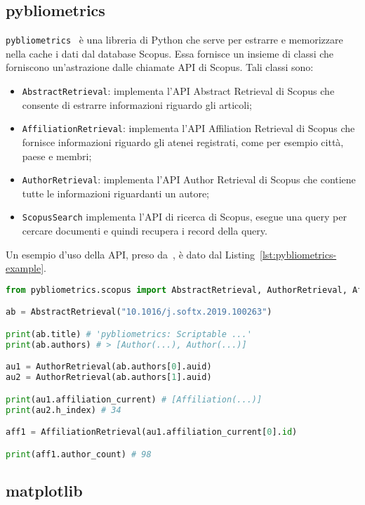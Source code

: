 \subsection{pybliometrics}\label{sec:pybliometrics}

\texttt{pybliometrics}~\cite{pybliometrics} è una libreria di Python che serve per estrarre e memorizzare nella cache i dati dal database Scopus.
Essa fornisce un insieme di classi che forniscono un'astrazione dalle chiamate
API di Scopus. Tali classi sono:
\begin{itemize}
	\item \texttt{AbstractRetrieval}: implementa l'API Abstract Retrieval di
	Scopus che consente di estrarre informazioni riguardo gli articoli;
	\item \texttt{AffiliationRetrieval}: implementa l'API Affiliation Retrieval
	di Scopus che fornisce informazioni riguardo gli atenei registrati, come per
	esempio città, paese e membri;
	\item \texttt{AuthorRetrieval}: implementa l'API Author Retrieval di Scopus
	che contiene tutte le informazioni riguardanti un autore;
	\item \texttt{ScopusSearch} implementa l'API di ricerca di Scopus, esegue una
	query per cercare documenti e quindi recupera i record della query.
\end {itemize}

Un esempio d'uso della API, preso da~\cite{pybliometrics}, è dato dal
Listing~\ref{lst:pybliometrics-example}.

\begin{lstlisting}[language=Python, caption=Esempio d'uso di \texttt{pybliometrics}, label=lst:pybliometrics-example]
from pybliometrics.scopus import AbstractRetrieval, AuthorRetrieval, AffiliationRetrieval

ab = AbstractRetrieval("10.1016/j.softx.2019.100263")

print(ab.title) # 'pybliometrics: Scriptable ...'
print(ab.authors) # > [Author(...), Author(...)]

au1 = AuthorRetrieval(ab.authors[0].auid)
au2 = AuthorRetrieval(ab.authors[1].auid)

print(au1.affiliation_current) # [Affiliation(...)]
print(au2.h_index) # 34

aff1 = AffiliationRetrieval(au1.affiliation_current[0].id)

print(aff1.author_count) # 98
\end{lstlisting}

\subsection{matplotlib}

